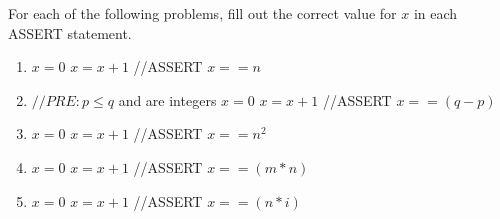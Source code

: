 \documentclass[12pt]{article}
\newenvironment{problem}[2][Problem]{\begin{trivlist}
\item[\hskip \labelsep {\bfseries #1}\hskip \labelsep {\bfseries #2.}]}{\end{trivlist}}
\begin{document}
\begin{problem}{8} 
For each of the following problems, fill out the correct value for $x$ in each
ASSERT statement.

\begin{enumerate}
 
 \item
 \begin{algorithm}[H]
 \begin{algorithmic}
 \State $x = 0$
   \State $x = x + 1$
 \EndFor
 \State //ASSERT $x == n $
 \end{algorithmic}
\end{algorithm} 

\item
\begin{algorithm}[H]
 \begin{algorithmic}
 \State $//PRE: p \leq q$ and are integers
 \State $x = 0$
   \State $x = x + 1$
 \EndFor
 \State //ASSERT $x == (q-p) $
 \end{algorithmic}
 \end{algorithm}
 
 \item
 \begin{algorithm}[H]
 \begin{algorithmic}
 \State $x = 0$
     \State $x = x + 1$
   \EndFor
 \EndFor
 \State //ASSERT $x == n^2 $
 \end{algorithmic}
\end{algorithm}
 
 \item
 \begin{algorithm}[H]
 \begin{algorithmic}
 \State $x = 0$
     \State $x = x + 1$
   \EndFor
 \EndFor
 \State //ASSERT $x == (m*n) $
 \end{algorithmic}
\end{algorithm}

 \item
 \begin{algorithm}[H]
 \begin{algorithmic}
 \State $x = 0$
     \State $x = x + 1$
   \EndFor
 \EndFor
 \State //ASSERT $x == (n*i) $
 \end{algorithmic}
 \end{algorithm}  

\end{enumerate}
\end{problem}
\end{document}
